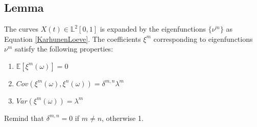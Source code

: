 \documentclass[11pt,twoside,a4paper]{article}
\begin{document}
	\subsection{Lemma} \label{Proof1}
	The curves $X(t) \in \mathbb{L}^2[0,1]$ is expanded by the eigenfunctions $\{\nu^m\}$ as Equation \ref{KarhunenLoeve}. The coefficients $\xi^{m}$ corresponding to eigenfunctions $\nu^m$ satisfy the following properties:
	
	\begin{multicols}{2}
		\begin{enumerate}
			\item $\mathbb{E}\left[\xi^m(\omega)\right] = 0$
			\item $Cov\left(\xi^m(\omega), \xi^n(\omega)\right) = \delta^{m,n}\lambda^m$%
			\item $Var\left(\xi^m(\omega)\right) = \lambda^m$
		\end{enumerate}
	\end{multicols}

	Remind that $\delta^{m,n} = 0$ if $m \neq n$, otherwise 1.
	
\end{document}
